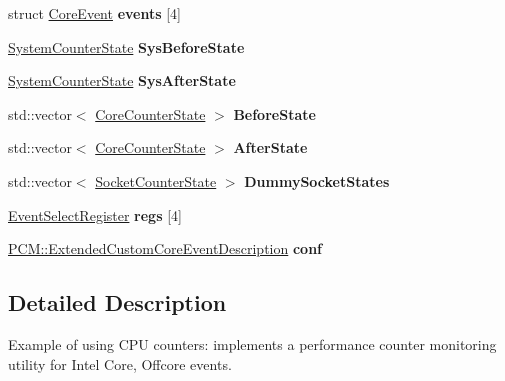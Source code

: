 \begin{DoxyCompactItemize}
\item 
\mbox{\label{pcm-core_8cpp_a0ae00fbd22b434b051a6b708d5d4ecd2}} 
struct \mbox{\hyperlink{struct_core_event}{Core\+Event}} {\bfseries events} \mbox{[}4\mbox{]}
\item 
\mbox{\label{pcm-core_8cpp_aebedf92d2f6c0782ac32db194b19a5b8}} 
\mbox{\hyperlink{class_system_counter_state}{System\+Counter\+State}} {\bfseries Sys\+Before\+State}
\item 
\mbox{\label{pcm-core_8cpp_aa0eab8e3e3860274766705461599642f}} 
\mbox{\hyperlink{class_system_counter_state}{System\+Counter\+State}} {\bfseries Sys\+After\+State}
\item 
\mbox{\label{pcm-core_8cpp_a291977796d10cd87794df3cbf5e09406}} 
std\+::vector$<$ \mbox{\hyperlink{class_core_counter_state}{Core\+Counter\+State}} $>$ {\bfseries Before\+State}
\item 
\mbox{\label{pcm-core_8cpp_a7b363cbd24d048c42704650435b127c4}} 
std\+::vector$<$ \mbox{\hyperlink{class_core_counter_state}{Core\+Counter\+State}} $>$ {\bfseries After\+State}
\item 
\mbox{\label{pcm-core_8cpp_a1efdfab09d596110dd1d569538dc1a91}} 
std\+::vector$<$ \mbox{\hyperlink{class_socket_counter_state}{Socket\+Counter\+State}} $>$ {\bfseries Dummy\+Socket\+States}
\item 
\mbox{\label{pcm-core_8cpp_a08f1bd7b17fbac49ffec3c02eb08bb96}} 
\mbox{\hyperlink{struct_event_select_register}{Event\+Select\+Register}} {\bfseries regs} \mbox{[}4\mbox{]}
\item 
\mbox{\label{pcm-core_8cpp_a39619e6e2e5b320df1bd3761f65d45a6}} 
\mbox{\hyperlink{struct_p_c_m_1_1_extended_custom_core_event_description}{P\+C\+M\+::\+Extended\+Custom\+Core\+Event\+Description}} {\bfseries conf}
\end{DoxyCompactItemize}


\subsection{Detailed Description}
Example of using C\+PU counters\+: implements a performance counter monitoring utility for Intel Core, Offcore events. 

